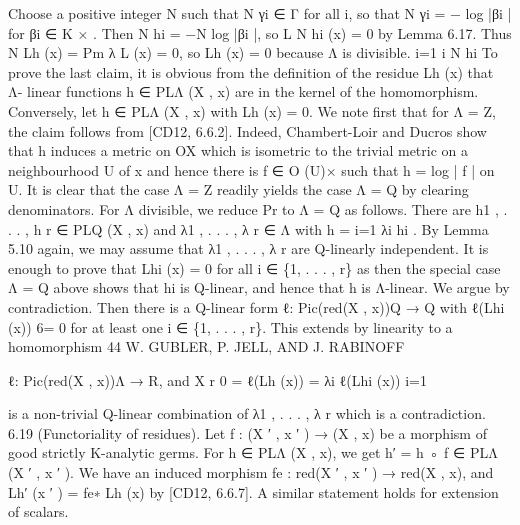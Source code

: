 \documentclass[
  10pt,
]{article}
\newenvironment{Shaded}{}{}
\newcommand{\NormalTok}[1]{#1}
\begin{document}
\begin{Shaded}
\begin{Highlighting}[]
\NormalTok{   Choose a positive integer N such that N γi ∈ Γ for all i, so that N γi = − log |βi | for}
\NormalTok{βi ∈ K × . Then N hi = −N log |βi |, so L N hi (x) = 0 by Lemma 6.17. Thus N Lh (x) =}
\NormalTok{Pm}
\NormalTok{         λ L (x) = 0, so Lh (x) = 0 because Λ is divisible.}
\NormalTok{   i=1 i N hi}
\NormalTok{   To prove the last claim, it is obvious from the definition of the residue Lh (x) that Λ{-}}
\NormalTok{linear functions h ∈ PLΛ (X , x) are in the kernel of the homomorphism. Conversely, let}
\NormalTok{h ∈ PLΛ (X , x) with Lh (x) = 0. We note first that for Λ = Z, the claim follows from [CD12,}
\NormalTok{6.6.2]. Indeed, Chambert{-}Loir and Ducros show that h induces a metric on OX which is}
\NormalTok{isometric to the trivial metric on a neighbourhood U of x and hence there is f ∈ O (U)×}
\NormalTok{such that h = log | f | on U. It is clear that the case Λ = Z readily yields the case Λ = Q}
\NormalTok{by clearing denominators.}
\NormalTok{   For Λ divisible, we reduce Pr to Λ = Q as follows. There are h1 , . . . , h r ∈ PLQ (X , x) and}
\NormalTok{λ1 , . . . , λ r ∈ Λ with h = i=1 λi hi . By Lemma 5.10 again, we may assume that λ1 , . . . , λ r}
\NormalTok{are Q{-}linearly independent. It is enough to prove that Lhi (x) = 0 for all i ∈ \{1, . . . , r\} as}
\NormalTok{then the special case Λ = Q above shows that hi is Q{-}linear, and hence that h is Λ{-}linear.}
\NormalTok{We argue by contradiction. Then there is a Q{-}linear form ℓ: Pic(red(X , x))Q → Q with}
\NormalTok{ℓ(Lhi (x)) 6= 0 for at least one i ∈ \{1, . . . , r\}. This extends by linearity to a homomorphism}
\NormalTok{44                                 W. GUBLER, P. JELL, AND J. RABINOFF}

\NormalTok{ℓ: Pic(red(X , x))Λ → R, and}
\NormalTok{                                                     X}
\NormalTok{                                                     r}
\NormalTok{                                   0 = ℓ(Lh (x)) =          λi ℓ(Lhi (x))}
\NormalTok{                                                      i=1}

\NormalTok{is a non{-}trivial Q{-}linear combination of λ1 , . . . , λ r which is a contradiction.                     }
\NormalTok{6.19 (Functoriality of residues). Let f : (X ′ , x ′ ) → (X , x) be a morphism of good strictly}
\NormalTok{K{-}analytic germs. For h ∈ PLΛ (X , x), we get h′ = h ◦ f ∈ PLΛ (X ′ , x ′ ). We have an induced}
\NormalTok{morphism fe : red(X ′ , x ′ ) → red(X , x), and Lh′ (x ′ ) = fe∗ Lh (x) by [CD12, 6.6.7]. A similar}
\NormalTok{statement holds for extension of scalars.}


\end{Highlighting}
\end{Shaded}
\end{document}
